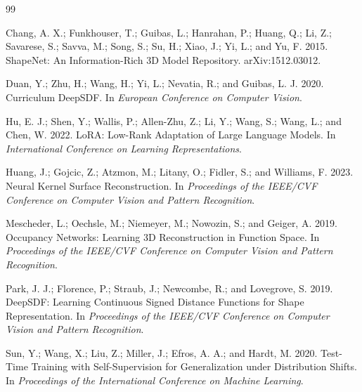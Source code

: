 \documentclass[letterpaper]{article}
\begin{document}
\begin{thebibliography}{99}

Chang, A. X.; Funkhouser, T.; Guibas, L.; Hanrahan, P.; Huang, Q.; Li, Z.; Savarese, S.; Savva, M.; Song, S.; Su, H.; Xiao, J.; Yi, L.; and Yu, F. 2015.
ShapeNet: An Information-Rich 3D Model Repository.
arXiv:1512.03012.

Duan, Y.; Zhu, H.; Wang, H.; Yi, L.; Nevatia, R.; and Guibas, L. J. 2020.
Curriculum DeepSDF.
In \emph{European Conference on Computer Vision}.

Hu, E. J.; Shen, Y.; Wallis, P.; Allen-Zhu, Z.; Li, Y.; Wang, S.; Wang, L.; and Chen, W. 2022.
LoRA: Low-Rank Adaptation of Large Language Models.
In \emph{International Conference on Learning Representations}.

Huang, J.; Gojcic, Z.; Atzmon, M.; Litany, O.; Fidler, S.; and Williams, F. 2023.
Neural Kernel Surface Reconstruction.
In \emph{Proceedings of the IEEE/CVF Conference on Computer Vision and Pattern Recognition}.

Mescheder, L.; Oechsle, M.; Niemeyer, M.; Nowozin, S.; and Geiger, A. 2019.
Occupancy Networks: Learning 3D Reconstruction in Function Space.
In \emph{Proceedings of the IEEE/CVF Conference on Computer Vision and Pattern Recognition}.

Park, J. J.; Florence, P.; Straub, J.; Newcombe, R.; and Lovegrove, S. 2019.
DeepSDF: Learning Continuous Signed Distance Functions for Shape Representation.
In \emph{Proceedings of the IEEE/CVF Conference on Computer Vision and Pattern Recognition}.

Sun, Y.; Wang, X.; Liu, Z.; Miller, J.; Efros, A. A.; and Hardt, M. 2020.
Test-Time Training with Self-Supervision for Generalization under Distribution Shifts.
In \emph{Proceedings of the International Conference on Machine Learning}.

\end{thebibliography}
\end{document}
